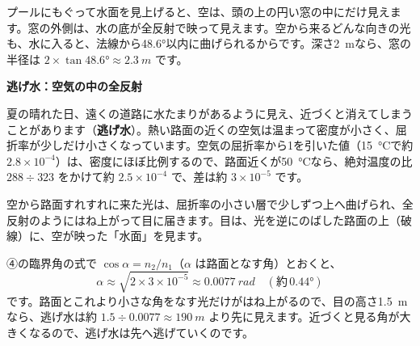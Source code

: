\begin{phmijika}[水の中から見上げた空]
プールにもぐって水面を見上げると、空は、頭の上の円い窓の中にだけ見えます。窓の外側は、水の底が全反射で映って見えます。空から来るどんな向きの光も、水に入ると、法線から\ang{48.6}以内に曲げられるからです。深さ\qty{2}{m}なら、窓の半径は $2\times\tan\ang{48.6}\approx\qty{2.3}{m}$ です。
\end{phmijika}

\begin{motto}[4]
\textbf{逃げ水：空気の中の全反射}\par
夏の晴れた日、遠くの道路に水たまりがあるように見え、近づくと消えてしまうことがあります（\textbf{逃げ水}）。熱い路面の近くの空気は温まって密度が小さく、屈折率が少しだけ小さくなっています。空気の屈折率から1を引いた値（\qty{15}{\celsius}で約 $2.8\times10^{-4}$）は、密度にほぼ比例するので、路面近くが\qty{50}{\celsius}なら、絶対温度の比 $288\div323$ をかけて約 $2.5\times10^{-4}$ で、差は約 $3\times10^{-5}$ です。

\noindent\begin{minipage}[c]{0.5\linewidth}\centering
{}
\end{minipage}\hfill
\begin{minipage}[c]{0.46\linewidth}\raggedright\small
空から路面すれすれに来た光は、屈折率の小さい層で少しずつ上へ曲げられ、全反射のようにはね上がって目に届きます。目は、光を逆にのばした路面の上（破線）に、空が映った「水面」を見ます。
\end{minipage}

\par\smallskip
④の臨界角の式で $\cos\alpha=n_2/n_1$（$\alpha$ は路面となす角）とおくと、
\[\alpha\approx\sqrt{2\times3\times10^{-5}}\approx\qty{0.0077}{rad}\quad(\text{約}\,\ang{0.44})\]
です。路面とこれより小さな角をなす光だけがはね上がるので、目の高さ\qty{1.5}{m}なら、逃げ水は約 $1.5\div0.0077\approx\qty{190}{m}$ より先に見えます。近づくと見る角が大きくなるので、逃げ水は先へ逃げていくのです。
\end{motto}

